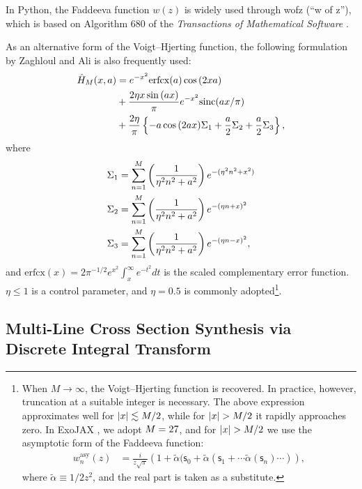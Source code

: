 In Python, the Faddeeva function $w(z)$ is widely used through {\sf wofz} (``w of z''), 
which is based on Algorithm 680 of the {\it Transactions of Mathematical Software} \cite{poppe1990algorithm}.

As an alternative form of the Voigt--Hjerting function, the following formulation by Zaghloul and Ali \cite{2011arXiv1106.0151Z} is also frequently used:
\begin{align}
\label{eq:algo916}
\hat{H}_{M}(x,a) &= e^{-x^2} \mathrm{erfcx} (a) \cos{(2 x a)} \nonumber \\
&+ \frac{2 \eta x \sin{(a x)}}{\pi}  e^{-x^2} \mathrm{sinc} (a x/\pi) \nonumber \\
&+ \frac{2 \eta}{\pi} \left\{  - a \cos{(2 a x)} \Sigma_1 + \frac{a}{2} \Sigma_2 + \frac{a}{2} \Sigma_3 \right\},
\end{align}
where
\begin{align}
\Sigma_1 &= \sum_{n=1}^{M} \left( \frac{1}{\eta^2 n^2 + a^2}\right) e^{-(\eta^2 n^2 + x^2)}  \\
\Sigma_2 &= \sum_{n=1}^{M} \left( \frac{1}{\eta^2 n^2 + a^2}\right) e^{-(\eta n + x)^2}  \\
\Sigma_3 &= \sum_{n=1}^{M} \left( \frac{1}{\eta^2 n^2 + a^2}\right) e^{-(\eta n - x)^2}, 
\end{align}
and $\mathrm{erfcx} (x) = 2 \pi^{-1/2} e^{x^2} \int_x^\infty e^{-t^2} dt$ is the scaled complementary error function.  
$\eta \le 1$ is a control parameter, and $\eta=0.5$ is commonly adopted\footnote{When $M \to \infty$, the Voigt--Hjerting function is recovered. In practice, however, truncation at a suitable integer is necessary. The above expression approximates well for $|x| \lesssim M/2$, while for $|x| > M/2$ it rapidly approaches zero. In {\sf ExoJAX} \href{https://github.com/HajimeKawahara/exojax}{}, we adopt $M=27$, and for $|x|>\Ncut/2$ we use the asymptotic form of the Faddeeva function:
\begin{align}
\label{eq:asywofz}
  w_n^\mathrm{asy}(z) &= \frac{i}{z \sqrt{\pi}} \left( 1 + \tilde{\alpha} ( \mathsf{s}_0 + \tilde{\alpha} ( \mathsf{s}_1 +  \cdots \tilde{\alpha}  ( \mathsf{s}_n )\cdots) \right),
\end{align}
where $\tilde{\alpha} \equiv {1}/{2 z^2}$, and the real part is taken as a substitute.}.

\subsection*{Multi-Line Cross Section Synthesis via Discrete Integral Transform}

